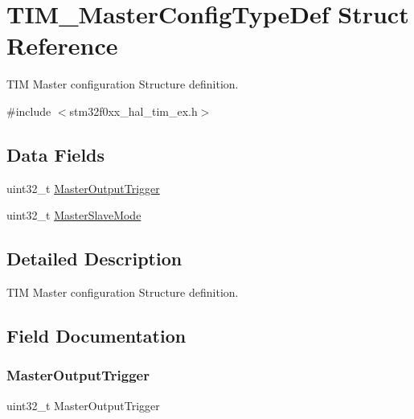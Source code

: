 \hypertarget{struct_t_i_m___master_config_type_def}{}\section{T\+I\+M\+\_\+\+Master\+Config\+Type\+Def Struct Reference}
\label{struct_t_i_m___master_config_type_def}


T\+IM Master configuration Structure definition.  




{\ttfamily \#include $<$stm32f0xx\+\_\+hal\+\_\+tim\+\_\+ex.\+h$>$}

\subsection*{Data Fields}
\begin{DoxyCompactItemize}
\item 
uint32\+\_\+t \hyperlink{struct_t_i_m___master_config_type_def_aafb70c2c7a9a93a3dad59a350df2b00f}{Master\+Output\+Trigger}
\item 
uint32\+\_\+t \hyperlink{struct_t_i_m___master_config_type_def_aa17903ecbee15ce7a6d51de5e9602d3f}{Master\+Slave\+Mode}
\end{DoxyCompactItemize}


\subsection{Detailed Description}
T\+IM Master configuration Structure definition. 

\subsection{Field Documentation}
\mbox{\label{struct_t_i_m___master_config_type_def_aafb70c2c7a9a93a3dad59a350df2b00f}} 
\subsubsection{\texorpdfstring{Master\+Output\+Trigger}{MasterOutputTrigger}}
{\footnotesize\ttfamily uint32\+\_\+t Master\+Output\+Trigger}

